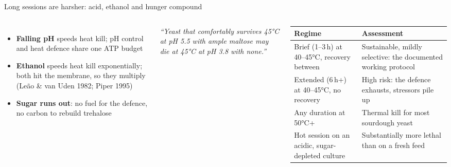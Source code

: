 \documentclass[aspectratio=169,11pt]{beamer}
\newcommand{\tablestart}[2]{\begingroup\renewcommand{\arraystretch}{#1}#2}
\newcommand{\tableend}{\endgroup\par}
\begin{document}
\begin{frame}{Long sessions are harsher: acid, ethanol and hunger compound}
  \begin{columns}[T]
      \begin{itemize}\footnotesize
        \item \textbf{Falling pH} speeds heat kill; pH control and heat defence share
          one ATP budget
        \item \textbf{Ethanol} speeds heat kill exponentially; both hit the membrane, so
          they multiply (Leão \& van Uden 1982; Piper 1995)
        \item \textbf{Sugar runs out}: no fuel for the defence, no carbon to rebuild
          trehalose
      \end{itemize}
      \smallskip
      {\footnotesize\itshape ``Yeast that comfortably survives 45°C at pH 5.5 with ample
      maltose may die at 45°C at pH 3.8 with none.''\par}
      \tablestart{1.2}{\scriptsize}
      \begin{tabularx}{\linewidth}{@{}P{2.7cm}L@{}}
        \toprule
        \textbf{Regime} & \textbf{Assessment} \\
        \midrule
        Brief (1–3\,h) at 40–45°C, recovery between & Sustainable, mildly selective:
          the documented working protocol \\
        Extended (6\,h+) at 40–45°C, no recovery & High risk: the defence exhausts,
          stressors pile up \\
        Any duration at 50°C+ & Thermal kill for most sourdough yeast \\
        Hot session on an acidic, sugar-depleted culture & Substantially more lethal
          than on a fresh feed \\
        \bottomrule
      \end{tabularx}
      \tableend
  \end{columns}
\end{frame}
\end{document}
